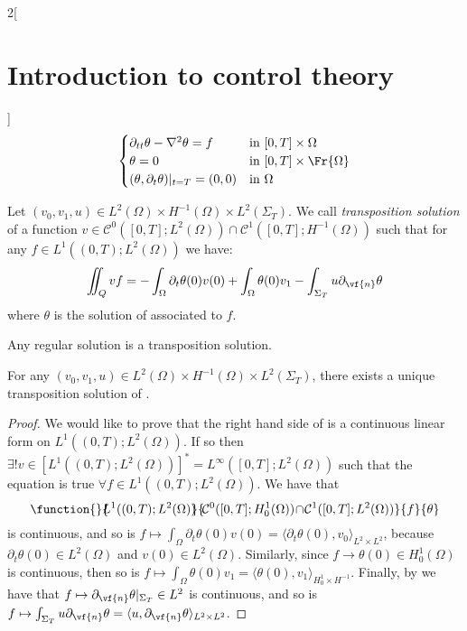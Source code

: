 \documentclass[../../../main_math.tex]{subfiles}
\begin{document}
\begin{multicols}{2}[\section{Introduction to control theory}]
  \begin{equation}\label{ICT:wave_equation_control_dual}
    \begin{cases}
      \partial_{tt} \theta - \laplacian \theta = f & \text{in } [0,T]\times \Omega      \\
      \theta = 0                                   & \text{in } [0,T]\times \Fr{\Omega} \\
      (\theta,\partial_t \theta)|_{t=T} = (0,0)    & \text{in } \Omega
    \end{cases}
  \end{equation}
  \begin{definition}
    Let $(v_0,v_1,u)\in L^2(\Omega)\times H^{-1}(\Omega)\times L^2(\Sigma_T)$. We call \emph{transposition solution} of  a function $v\in \mathcal{C}^0([0,T]; L^2(\Omega))\cap \mathcal{C}^1([0,T]; H^{-1}(\Omega))$ such that for any $f\in L^1((0,T); L^2(\Omega))$ we have:
    \begin{equation}\label{ICT:transposition_solution}
      \iint_Q vf = -\int_\Omega \partial_t\theta(0) v(0) +\int_\Omega \theta(0) v_1-\int_{\Sigma_T} u \partial_{\vf{n}} \theta
    \end{equation}
    where $\theta$ is the solution of  associated to $f$.
  \end{definition}
  \begin{remark}
    Any regular solution is a transposition solution.
  \end{remark}
  \begin{theorem}
    For any $(v_0,v_1,u)\in L^2(\Omega)\times H^{-1}(\Omega)\times L^2(\Sigma_T)$, there exists a unique transposition solution of .
  \end{theorem}
  \begin{proof}
    We would like to prove that the right hand side of  is a continuous linear form on $L^1((0,T); L^2(\Omega))$. If so then $\exists! v\in [L^1((0,T); L^2(\Omega))]^*=L^\infty([0,T]; L^2(\Omega))$ such that the equation is true $\forall f\in L^1((0,T); L^2(\Omega))$. We have that
    $$
      \function{}{\!\!\!L^1((0,T); L^2(\Omega))\!\!}{\!\mathcal{C}^0([0,T]; H_0^1(\Omega))\!\cap\! \mathcal{C}^1([0,T]; L^2(\Omega))}{f}{\theta}
    $$
    is continuous, and so is $f\mapsto \int_\Omega \partial_t\theta(0) v(0)=\langle \partial_t\theta(0),v_0\rangle_{L^2\times L^2}$, because $\partial_t\theta(0)\in L^2(\Omega)$ and $v(0)\in L^2(\Omega)$. Similarly, since $f\to \theta(0)\in H_0^1(\Omega)$ is continuous, then so is $f\mapsto \int_\Omega \theta(0) v_1=\langle \theta(0),v_1\rangle_{H_0^1\times H^{-1}}$. Finally, by  we have that $f\mapsto \partial_{\vf{n}}\theta|_{\Sigma_T}\in L^2$ is continuous, and so is $f\mapsto \int_{\Sigma_T} u \partial_{\vf{n}} \theta=\langle u,\partial_{\vf{n}}\theta\rangle_{L^2\times L^2}$.

\end{proof}
\end{multicols}
\end{document}
